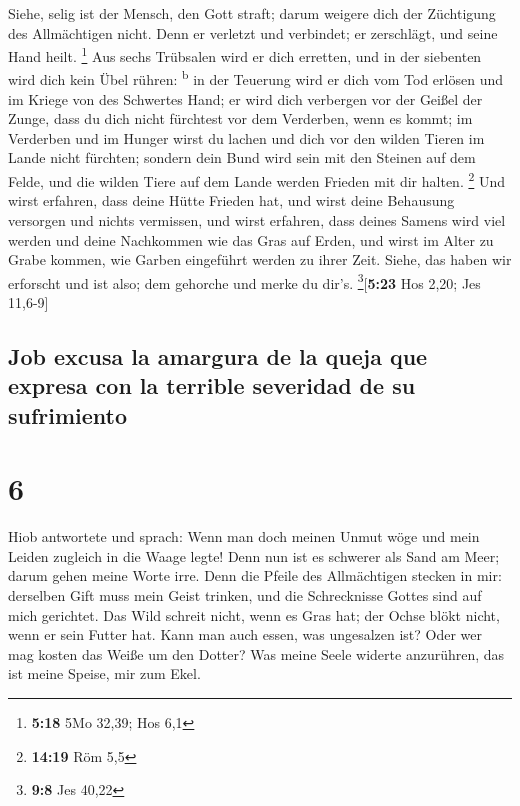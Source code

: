  Siehe, selig ist der Mensch, den Gott straft; darum
weigere dich der Züchtigung des Allmächtigen nicht.  Denn
er verletzt und verbindet; er zerschlägt, und seine Hand heilt.
\footnote{\textbf{5:18} 5Mo 32,39; Hos 6,1}  Aus sechs
Trübsalen wird er dich erretten, und in der siebenten wird dich kein
Übel rühren: \textsuperscript{b}  in der Teuerung wird er
dich vom Tod erlösen und im Kriege von des Schwertes Hand;
 er wird dich verbergen vor der Geißel der Zunge, dass du
dich nicht fürchtest vor dem Verderben, wenn es kommt; 
im Verderben und im Hunger wirst du lachen und dich vor den wilden
Tieren im Lande nicht fürchten;  sondern dein Bund wird
sein mit den Steinen auf dem Felde, und die wilden Tiere auf dem Lande
werden Frieden mit dir halten. \footnote{\textbf{14:19} Röm 5,5}
 Und wirst erfahren, dass deine Hütte Frieden hat, und
wirst deine Behausung versorgen und nichts vermissen, 
und wirst erfahren, dass deines Samens wird viel werden und deine
Nachkommen wie das Gras auf Erden,  und wirst im Alter zu
Grabe kommen, wie Garben eingeführt werden zu ihrer Zeit.
 Siehe, das haben wir erforscht und ist also; dem
gehorche und merke du dir's. \footnote{\textbf{9:8} Jes 40,22}{[}\textbf{5:23}
Hos 2,20; Jes 11,6-9{]}

\hypertarget{job-excusa-la-amargura-de-la-queja-que-expresa-con-la-terrible-severidad-de-su-sufrimiento}{%
\subsection{Job excusa la amargura de la queja que expresa con la
terrible severidad de su
sufrimiento}\label{job-excusa-la-amargura-de-la-queja-que-expresa-con-la-terrible-severidad-de-su-sufrimiento}}

\hypertarget{section-5}{%
\section{6}\label{section-5}}

 Hiob antwortete und sprach:  Wenn man doch
meinen Unmut wöge und mein Leiden zugleich in die Waage legte!
 Denn nun ist es schwerer als Sand am Meer; darum gehen
meine Worte irre.  Denn die Pfeile des Allmächtigen
stecken in mir: derselben Gift muss mein Geist trinken, und die
Schrecknisse Gottes sind auf mich gerichtet.  Das Wild
schreit nicht, wenn es Gras hat; der Ochse blökt nicht, wenn er sein
Futter hat.  Kann man auch essen, was ungesalzen ist? Oder
wer mag kosten das Weiße um den Dotter?  Was meine Seele
widerte anzurühren, das ist meine Speise, mir zum Ekel.

